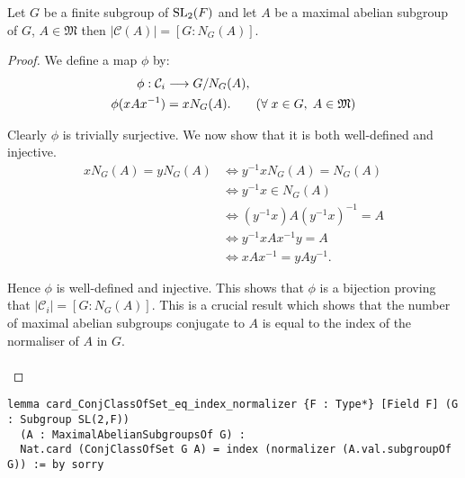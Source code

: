 \begin{theorem}
\label{card_ConjClassOfSet_eq_index_normalizer}

Let $G$ be a finite subgroup of $\operatorname{SL}_2(F)$ and let $A$ be a maximal abelian subgroup of $G$, 
$A \in \mathfrak{M}$ then $|\mathcal{C}(A)| = [G : N_G(A)]$.
\end{theorem}
\begin{proof}
  We define a map $\phi$ by:
  \begin{align*} \phi: \mathcal{C}_i &\longrightarrow G / N_G(A),
  \\ \phi(xAx^{-1}) &= xN_G(A). \tag{$\forall \; x \in G, \; A \in \mathfrak{M}$}
  \end{align*}
  
  Clearly $\phi$ is trivially surjective. We now show that it is both well-defined and injective.
  \begin{align*} xN_G(A) = yN_G(A) &\iff y^{-1}xN_G(A) = N_G(A) \\
  &\iff y^{-1}x \in N_G(A) \\
  &\iff (y^{-1}x)A(y^{-1}x)^{-1} = A \\
  &\iff y^{-1}xAx^{-1}y = A \\
  &\iff xAx^{-1} = yAy^{-1}.
  \end{align*}
  
  Hence $\phi$ is well-defined and injective. This shows that $\phi$ is a bijection proving that $|\mathcal{C}_i| = [G:N_G(A)]$. This is a crucial result which shows that the number of maximal abelian subgroups conjugate to $A$ is equal to the index of the normaliser of $A$ in $G$. \\
  \\
\end{proof}
\begin{footnotesize}
\begin{verbatim}
lemma card_ConjClassOfSet_eq_index_normalizer {F : Type*} [Field F] (G : Subgroup SL(2,F))
  (A : MaximalAbelianSubgroupsOf G) :
  Nat.card (ConjClassOfSet G A) = index (normalizer (A.val.subgroupOf G)) := by sorry
\end{verbatim}
\end{footnotesize}

